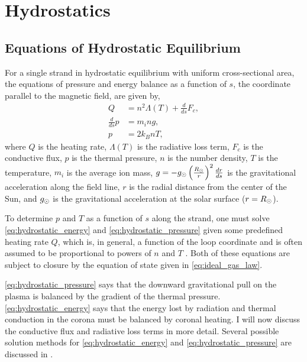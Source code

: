 \section{Hydrostatics}\label{sec:hydrostatic}

\subsection{Equations of Hydrostatic Equilibrium}\label{sec:hydrostatic_equations}

For a single strand in hydrostatic equilibrium with uniform cross-sectional area, the equations of pressure and energy balance as a function of $s$, the coordinate parallel to the magnetic field, are given by,
\begin{align}
    Q &= n^2\Lambda(T) + \frac{d}{ds}F_c, \label{eq:hydrostatic_energy} \\
    \frac{d}{ds}p &= m_ing, \label{eq:hydrostatic_pressure} \\
    p &= 2k_BnT, \label{eq:ideal_gas_law}
\end{align}
where $Q$ is the heating rate, $\Lambda(T)$ is the radiative loss term, $F_c$ is the conductive flux, $p$ is the thermal pressure, $n$ is the number density, $T$ is the temperature, $m_i$ is the average ion mass, $g=-g_\odot\left(\frac{R_\odot}{r}\right)^2\frac{dr}{ds}$ is the gravitational acceleration along the field line, $r$ is the radial distance from the center of the Sun, and $g_\odot$ is the gravitational acceleration at the solar surface ($r=R_\odot$).

To determine $p$ and $T$ as a function of $s$ along the strand, one must solve \autoref{eq:hydrostatic_energy} and \autoref{eq:hydrostatic_pressure} given some predefined heating rate $Q$, which is, in general, a function of the loop coordinate and is often assumed to be proportional to powers of $n$ and $T$ \citep{priest_magnetohydrodynamics_2014}. Both of these equations are subject to closure by the equation of state given in \autoref{eq:ideal_gas_law}.

\autoref{eq:hydrostatic_pressure} says that the downward gravitational pull on the plasma is balanced by the gradient of the thermal pressure. \autoref{eq:hydrostatic_energy} says that the energy lost by radiation and thermal conduction in the corona must be balanced by coronal heating. I will now discuss the conductive flux and radiative loss terms in more detail. Several possible solution methods for \autoref{eq:hydrostatic_energy} and \autoref{eq:hydrostatic_pressure} are discussed in .

